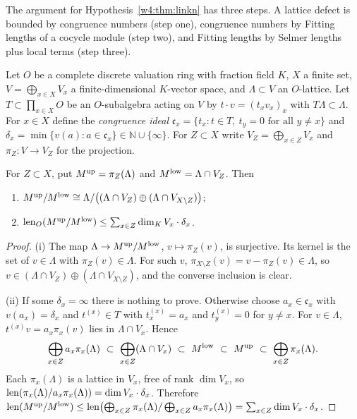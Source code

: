 The argument for Hypothesis~\ref{w4:thm:linkn} has three steps. A lattice defect is bounded by congruence numbers (step one), congruence numbers by Fitting lengths of a cocycle module (step two), and Fitting lengths by Selmer lengths plus local terms (step three).

Let $O$ be a complete discrete valuation ring with fraction field $K$, $X$ a finite set, $V=\bigoplus_{x\in X}V_x$ a finite-dimensional $K$-vector space, and $\Lambda\subset V$ an $O$-lattice. Let $T\subset\prod_{x\in X}O$ be an $O$-subalgebra acting on $V$ by $t\cdot v=(t_xv_x)_x$ with $T\Lambda\subset\Lambda$. For $x\in X$ define the \emph{congruence ideal} $\mathfrak c_x=\{t_x: t\in T,\ t_y=0\text{ for all }y\ne x\}$ and $\delta_x=\min\{v(a):a\in\mathfrak c_x\}\in\mathbb N\cup\{\infty\}$. For $Z\subset X$ write $V_Z=\bigoplus_{x\in Z}V_x$ and $\pi_Z\colon V\to V_Z$ for the projection.

\begin{proposition}\label{w4:prop:cong}
For $Z\subset X$, put $M^{\rm up}=\pi_Z(\Lambda)$ and $M^{\rm low}=\Lambda\cap V_Z$. Then
\begin{enumerate}[leftmargin=*,label=(\roman*)]
\item $M^{\rm up}/M^{\rm low}\cong\Lambda/\bigl((\Lambda\cap V_Z)\oplus(\Lambda\cap V_{X\setminus Z})\bigr)$;
\item $\operatorname{len}_O(M^{\rm up}/M^{\rm low})\le\sum_{x\in Z}\dim_KV_x\cdot\delta_x$.
\end{enumerate}
\end{proposition}

\begin{proof}
(i) The map $\Lambda\to M^{\rm up}/M^{\rm low}$, $v\mapsto\pi_Z(v)$, is surjective. Its kernel is the set of $v\in\Lambda$ with $\pi_Z(v)\in\Lambda$. For such $v$, $\pi_{X\setminus Z}(v)=v-\pi_Z(v)\in\Lambda$, so $v\in(\Lambda\cap V_Z)\oplus(\Lambda\cap V_{X\setminus Z})$, and the converse inclusion is clear.

(ii) If some $\delta_x=\infty$ there is nothing to prove. Otherwise choose $a_x\in\mathfrak c_x$ with $v(a_x)=\delta_x$ and $t^{(x)}\in T$ with $t^{(x)}_x=a_x$ and $t^{(x)}_y=0$ for $y\ne x$. For $v\in\Lambda$, $t^{(x)}v=a_x\pi_x(v)$ lies in $\Lambda\cap V_x$. Hence
\[
\bigoplus_{x\in Z}a_x\pi_x(\Lambda)\ \subset\ \bigoplus_{x\in Z}(\Lambda\cap V_x)\ \subset\ M^{\rm low}\ \subset\ M^{\rm up}\ \subset\ \bigoplus_{x\in Z}\pi_x(\Lambda).
\]
Each $\pi_x(\Lambda)$ is a lattice in $V_x$, free of rank $\dim V_x$, so $\operatorname{len}(\pi_x(\Lambda)/a_x\pi_x(\Lambda))=\dim V_x\cdot\delta_x$. Therefore $\operatorname{len}(M^{\rm up}/M^{\rm low})\le\operatorname{len}\bigl(\bigoplus_{x\in Z}\pi_x(\Lambda)/\bigoplus_{x\in Z}a_x\pi_x(\Lambda)\bigr)=\sum_{x\in Z}\dim V_x\cdot\delta_x$.
\end{proof}

